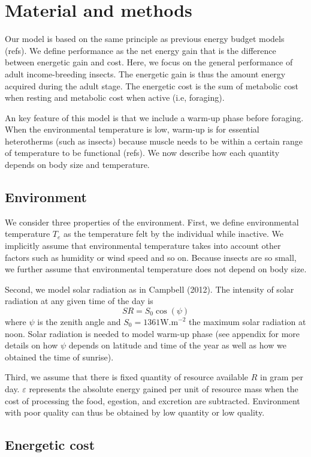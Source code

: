 \section*{Material and methods}
Our model is based on the same principle as previous energy budget models (refs).
We define performance as the net energy gain that is the difference between energetic gain and cost.
Here, we focus on the general performance of adult income-breeding insects. 
The energetic gain is thus the amount energy acquired during the adult stage.
The energetic cost is the sum of metabolic cost when resting and metabolic cost when active (i.e, foraging).

An key feature of this model is that we include a warm-up phase before foraging.
When the environmental temperature is low, warm-up is for essential heterotherms (such as insects) because muscle needs to be within a certain range of temperature to be functional (refs).
We now describe how each quantity depends on body size and temperature.

\subsection*{Environment}
We consider three properties of the environment. 
First, we define environmental temperature $T_e$ as the temperature felt by the individual while inactive.
We implicitly assume that environmental temperature takes into account other factors such as humidity or wind speed and so on.
Because insects are so small, we further assume that environmental temperature does not depend on body size.

Second, we model solar radiation as in Campbell (2012).
The intensity of solar radiation at any given time of the day is \[SR = S_0 \cos(\psi) \]
where $\psi$ is the zenith angle and $S_0 = 1361 \mbox{W.m}^{-2}$ the maximum solar radiation at noon.
Solar radiation is needed to model warm-up phase (see appendix for more details on how $\psi$ depends on latitude and time of the year as well as how we obtained the time of sunrise).

Third, we assume that there is fixed quantity of resource available $R$ in gram per day.
$\varepsilon$ represents the absolute energy gained per unit of resource mass when the cost of processing the food, egestion, and excretion are subtracted. 
Environment with poor quality can thus be obtained by low quantity or low quality.

\subsection*{Energetic cost}
